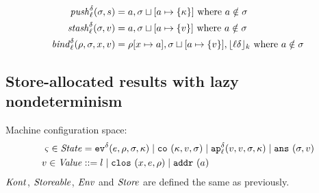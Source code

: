 \documentclass{llncs}
\newcommand{\alt}{\mid}
\begin{document}
\begin{align*}
\mathit{push}_{\ell}^{\delta}(\sigma,s) &= a,\sigma\sqcup[a\mapsto\{\kappa\}]
\mbox{ where }a \notin\sigma
\\
\mathit{stash}_{\ell}^{\delta}(\sigma,v) &= a,\sigma\sqcup[a\mapsto\{v\}]
\mbox{ where }a \notin\sigma
\\
\mathit{bind}_{\ell}^{\delta}(\rho,\sigma,x,v) &= \rho[x\mapsto a],\sigma\sqcup[a\mapsto\{v\}],\lfloor {\ell}{\delta} \rfloor_k
\mbox{ where }a \notin\sigma
\end{align*}

\subsection{Store-allocated results with lazy nondeterminism}

Machine configuration space:
\begin{align*}
\mstate \in \State &= \ev[^\mcntr]{\mexp, \menv, \msto, \mkont} \alt
                     \co{\mkont, \mval, \msto} \alt
                     \ap[_\mlab^\mcntr]{\mval,\mval,\msto,\mkont} \alt
                     \ans{\msto,\mval}\\
\mval \in \Value &::= \mlit \alt
                      \clos{\mvar,\mexp,\menv} \alt
                      \saddr\maddr
\end{align*}
$\mathit{Kont}$, $\mathit{Storeable}$, $\mathit{Env}$ and $\mathit{Store}$ are defined the same as previously.
\end{document}
